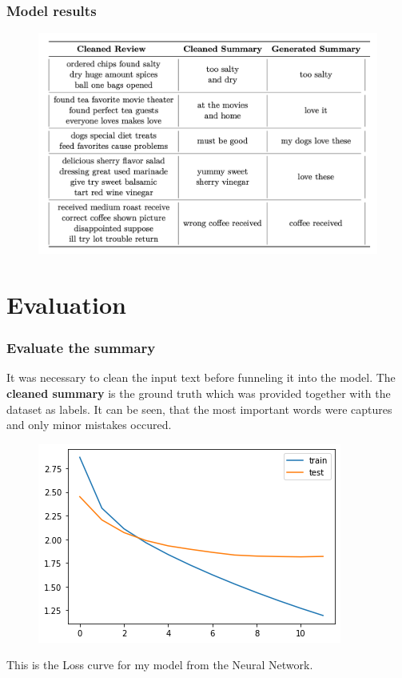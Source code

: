 \documentclass{beamer}
\begin{document}
\begin{frame}
\frametitle{Model results}
\begin{figure}
	\includegraphics[width=0.9\linewidth]{photo/prototype_outputs}
\end{figure}
\end{frame}

\section{Evaluation}
\begin{frame}
	\frametitle{Evaluate the summary}
It was necessary to clean the input text before funneling it into the model. The \textbf{cleaned summary} is the ground truth which was provided together with the dataset as labels. It can be seen, that the most important words were captures and only minor mistakes occured.

\begin{figure}
	\includegraphics[width=0.5\linewidth]{photo/eval}
\end{figure}

This is the Loss curve for my model from the Neural Network.
\end{frame}

\end{document}
